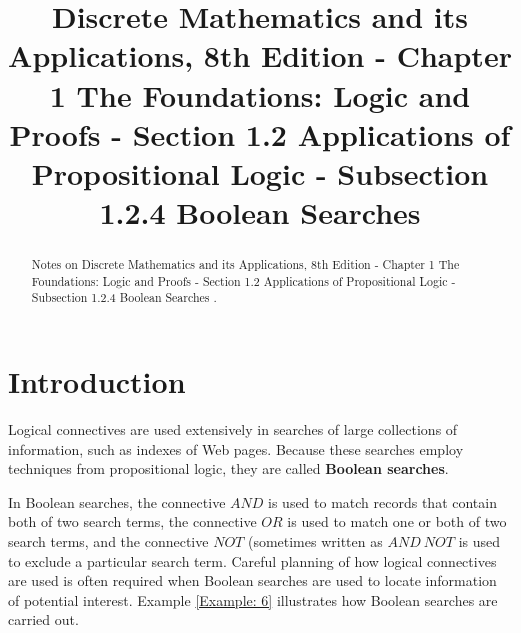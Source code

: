 \documentclass{Axon}
\title{Discrete Mathematics and its Applications, 8th Edition - Chapter 1 The Foundations: Logic and Proofs - Section 1.2 Applications of Propositional Logic - Subsection 1.2.4 Boolean Searches}
\begin{document}
\maketitle
\makeauthor
\begin{abstract}
Notes on Discrete Mathematics and its Applications, 8th Edition - Chapter 1 The Foundations: Logic and Proofs - Section 1.2 Applications of Propositional Logic - Subsection 1.2.4 Boolean Searches \cite{Rosen}.
\end{abstract}
\section{Introduction}
Logical connectives are used extensively in searches of large collections of information, such as indexes of Web pages. Because these searches employ techniques from propositional logic, they are called \textbf{Boolean searches}.

In Boolean searches, the connective \(AND\) is used to match records that contain both of two search terms, the connective \(OR\) is used to match one or both of two search terms, and the connective \(NOT\) (sometimes written as \(AND \ NOT\) is used to exclude a particular search term. Careful planning of how logical connectives are used is often required when Boolean searches are used to locate information of potential interest. Example \ref{Example: 6} illustrates how Boolean searches are carried out.
\end{document}
